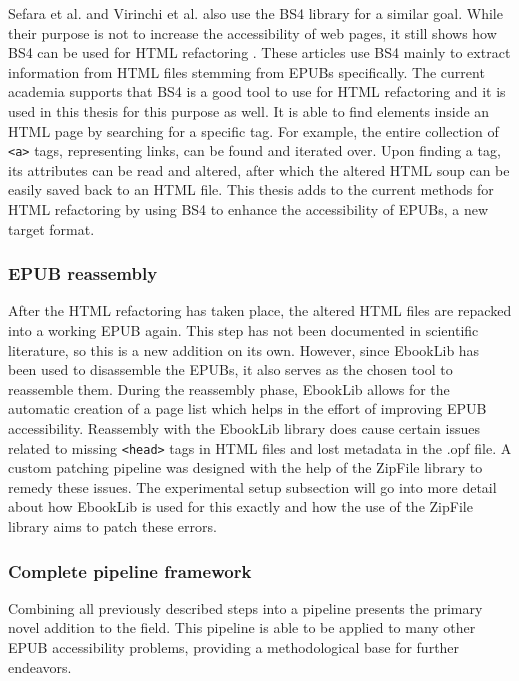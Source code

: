 Sefara et al. and Virinchi et al. also use the BS4 library for a similar goal. While their purpose is not to increase the accessibility of web pages, it still shows how BS4 can be used for HTML refactoring \cite{SefaraTextExtraction, VirinchiBrailleCloud}. These articles use BS4 mainly to extract information from HTML files stemming from EPUBs specifically. The current academia supports that BS4 is a good tool to use for HTML refactoring and it is used in this thesis for this purpose as well. It is able to find elements inside an HTML page by searching for a specific tag. For example, the entire collection of \texttt{<a>} tags, representing links, can be found and iterated over. Upon finding a tag, its attributes can be read and altered, after which the altered HTML soup can be easily saved back to an HTML file. This thesis adds to the current methods for HTML refactoring by using BS4 to enhance the accessibility of EPUBs, a new target format.


\subsubsection{EPUB reassembly}
After the HTML refactoring has taken place, the altered HTML files are repacked into a working EPUB again. This step has not been documented in scientific literature, so this is a new addition on its own. However, since EbookLib has been used to disassemble the EPUBs, it also serves as the chosen tool to reassemble them. During the reassembly phase, EbookLib allows for the automatic creation of a page list which helps in the effort of improving EPUB accessibility. Reassembly with the EbookLib library does cause certain issues related to missing \texttt{<head>} tags in HTML files and lost metadata in the .opf file. A custom patching pipeline was designed with the help of the ZipFile library to remedy these issues. The experimental setup subsection will go into more detail about how EbookLib is used for this exactly and how the use of the ZipFile library aims to patch these errors.
    

\subsubsection{Complete pipeline framework}
Combining all previously described steps into a pipeline presents the primary novel addition to the field. This pipeline is able to be applied to many other EPUB accessibility problems, providing a methodological base for further endeavors.




